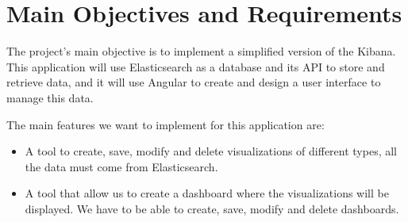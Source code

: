 \documentclass[a4paper, 12pt, english]{book}
\begin{document}





\section{Main Objectives and Requirements}
\label{sec:objectives}

The project's main objective is to implement a simplified version of the Kibana. This application will use Elasticsearch as a database and its API to store and retrieve data, and it will use Angular to create and design a user interface to manage this data.

The main features we want to implement for this application are:
\begin{itemize}
    \item A tool to create, save, modify and delete visualizations of different types, all the data must come from Elasticsearch.
    \item A tool that allow us to create a dashboard where the visualizations will be displayed. We have to be able to create, save, modify and delete dashboards.
\end{itemize}
\end{document}
